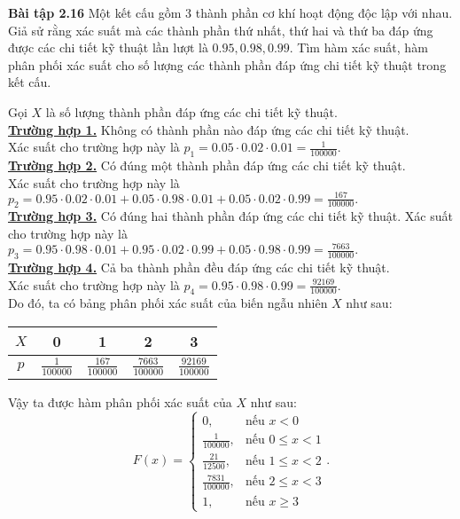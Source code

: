 \documentclass[12pt,a4paper]{article}
\begin{document}
\begin{mybox}
    \textbf{Bài tập 2.16} Một kết cấu gồm $3$ thành phần cơ khí hoạt động độc lập với nhau. Giả sử rằng xác suất mà các thành phần thứ nhất, thứ hai và thứ
    ba đáp ứng được các chi tiết kỹ thuật lần lượt là $0.95, 0.98, 0.99.$ Tìm hàm xác suất, hàm phân phối xác suất cho số lượng các thành phần đáp ứng chi tiết 
    kỹ thuật trong kết cấu.
\end{mybox}
Gọi $X$ là số lượng thành phần đáp ứng các chi tiết kỹ thuật.\\
\textbf{\underline{Trường hợp 1.}} Không có thành phần nào đáp ứng các chi tiết kỹ thuật.\\
Xác suất cho trường hợp này là $p_1 = 0.05 \cdot 0.02 \cdot 0.01 = \frac{1}{100000}.$\\
\textbf{\underline{Trường hợp 2.}} Có đúng một thành phần đáp ứng các chi tiết kỹ thuật.\\
Xác suất cho trường hợp này là $p_2 = 0.95 \cdot 0.02 \cdot 0.01 + 0.05 \cdot 0.98 \cdot 0.01 + 0.05 \cdot 0.02 \cdot 0.99 = \frac{167}{100000}.$\\
\textbf{\underline{Trường hợp 3.}} Có đúng hai thành phần đáp ứng các chi tiết kỹ thuật.
Xác suất cho trường hợp này là $p_3 = 0.95 \cdot 0.98 \cdot 0.01 + 0.95 \cdot 0.02 \cdot 0.99 + 0.05 \cdot 0.98 \cdot 0.99 = \frac{7663}{100000}.$\\
\textbf{\underline{Trường hợp 4.}} Cả ba thành phần đều đáp ứng các chi tiết kỹ thuật.\\
Xác suất cho trường hợp này là $p_4 = 0.95 \cdot 0.98 \cdot 0.99 = \frac{92169}{100000}.$\\
Do đó, ta có bảng phân phối xác suất của biến ngẫu nhiên $X$ như sau:
\begin{table}[H]
    \begin{center}
        \begin{tabular}{|c|c|c|c|c|}
            \hline 
            $X$ & 0 & 1 & 2 & 3 \\ 
            \hline 
            $p$ & $\frac{1}{100000}$ & $\frac{167}{100000}$ & $\frac{7663}{100000}$ & $\frac{92169}{100000}$  \\ 
            \hline 
            \end{tabular} 
    \end{center}
\end{table}
Vậy ta được hàm phân phối xác suất của $X$ như sau:
$$F \left( x \right) = 
\begin{cases}
    0, &\text{nếu } x < 0\\
    \frac{1}{100000}, &\text{nếu } 0 \leqslant x < 1\\
    \frac{21}{12500}, &\text{nếu } 1 \leqslant x < 2\\
    \frac{7831}{100000}, &\text{nếu } 2 \leqslant x < 3\\
    1, &\text{nếu } x \geqslant 3
\end{cases}
.$$
\end{document}
